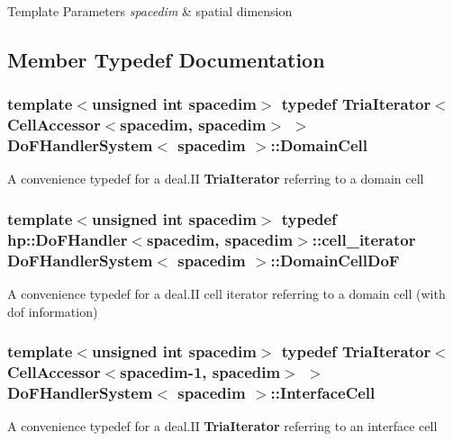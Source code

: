 \begin{DoxyTemplParams}{Template Parameters}
{\em spacedim} & spatial dimension \\
\hline
\end{DoxyTemplParams}


\subsection{Member Typedef Documentation}
\subsubsection[{\texorpdfstring{Domain\+Cell}{DomainCell}}]{\setlength{\rightskip}{0pt plus 5cm}template$<$unsigned int spacedim$>$ typedef {\bf Tria\+Iterator}$<${\bf Cell\+Accessor}$<$spacedim, spacedim$>$ $>$ {\bf Do\+F\+Handler\+System}$<$ spacedim $>$\+::{\bf Domain\+Cell}}\hypertarget{class_do_f_handler_system_a84df955a5d8da7e1439a10f2a64811c0}{}\label{class_do_f_handler_system_a84df955a5d8da7e1439a10f2a64811c0}
A convenience typedef for a deal.\+II {\bf Tria\+Iterator} referring to a domain cell 
\subsubsection[{\texorpdfstring{Domain\+Cell\+DoF}{DomainCellDoF}}]{\setlength{\rightskip}{0pt plus 5cm}template$<$unsigned int spacedim$>$ typedef {\bf hp\+::\+Do\+F\+Handler}$<$spacedim, spacedim$>$\+::{\bf cell\+\_\+iterator} {\bf Do\+F\+Handler\+System}$<$ spacedim $>$\+::{\bf Domain\+Cell\+DoF}}\hypertarget{class_do_f_handler_system_a01c54960bba8faa935d32f2d3d2fe914}{}\label{class_do_f_handler_system_a01c54960bba8faa935d32f2d3d2fe914}
A convenience typedef for a deal.\+II cell iterator referring to a domain cell (with dof information) 
\subsubsection[{\texorpdfstring{Interface\+Cell}{InterfaceCell}}]{\setlength{\rightskip}{0pt plus 5cm}template$<$unsigned int spacedim$>$ typedef {\bf Tria\+Iterator}$<${\bf Cell\+Accessor}$<$spacedim-\/1, spacedim$>$ $>$ {\bf Do\+F\+Handler\+System}$<$ spacedim $>$\+::{\bf Interface\+Cell}}\hypertarget{class_do_f_handler_system_a64bfb9dab5f61c2583896a7d086cb1f2}{}\label{class_do_f_handler_system_a64bfb9dab5f61c2583896a7d086cb1f2}
A convenience typedef for a deal.\+II {\bf Tria\+Iterator} referring to an interface cell 
